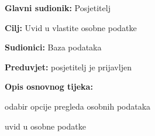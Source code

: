 					\noindent {}
					\begin{packed_item}
	
						\item \textbf{Glavni sudionik: }Posjetitelj
						\item  \textbf{Cilj:} Uvid u vlastite osobne podatke
						\item  \textbf{Sudionici:} Baza podataka
						\item  \textbf{Preduvjet:} posjetitelj je prijavljen
						\item  \textbf{Opis osnovnog tijeka:}
						
						\item[] \begin{packed_enum}
	
							\item odabir opcije pregleda osobnih podataka
							\item uvid u osobne podatke
							
						\end{packed_enum}
					\end{packed_item}
					
